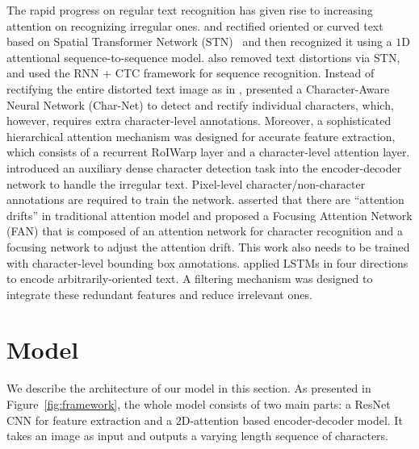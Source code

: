 \documentclass[letterpaper]{article} \usepackage{aaai19}  \usepackage{times}  \usepackage{helvet}  \usepackage{courier}  \usepackage{url}  \usepackage{graphicx}  \usepackage{amsmath}
\begin{document}
The rapid progress on regular text recognition has given rise to increasing attention on recognizing irregular ones.
\cite{shiPAMI2018} and \cite{shiCVPR2016} rectified oriented or curved text based on Spatial Transformer Network (STN)~\cite{jaderberg2015spatial} and
then recognized it using a $1$D attentional sequence-to-sequence model.
\cite{BMVC2016_43} also removed text distortions via STN, and used the RNN + CTC framework for sequence recognition.
Instead of rectifying the entire distorted text image as in \cite{shiPAMI2018,BMVC2016_43}, \cite{Liu2018CharNetAC} presented a Character-Aware Neural Network (Char-Net) to detect and rectify individual characters, which, however, requires extra character-level annotations. Moreover, a sophisticated hierarchical attention mechanism was designed for accurate feature extraction, which consists of a recurrent RoIWarp layer and a character-level attention layer.
\cite{ijcai2017} introduced an auxiliary dense character detection task into the encoder-decoder network to handle the irregular text. Pixel-level character/non-character annotations are required to train the network.
\cite{Cheng2017} asserted that there are ``attention drifts'' in traditional attention model and proposed a Focusing Attention Network (FAN) that is composed of an attention network for character recognition and a focusing network to adjust the attention drift. This work also needs to be trained with character-level bounding box annotations.
\cite{Cheng2018AON} applied LSTMs in four directions to encode arbitrarily-oriented text. A filtering mechanism was designed to integrate these redundant features and reduce irrelevant ones.


\section{Model}
\label{sec:Model}
We describe the architecture of our model in this section. As presented in Figure~\ref{fig:framework}, the whole model consists of two main parts: a ResNet CNN for feature extraction and a $2$D-attention based encoder-decoder model. It takes an image as input and outputs a varying length sequence of characters.
\end{document}

